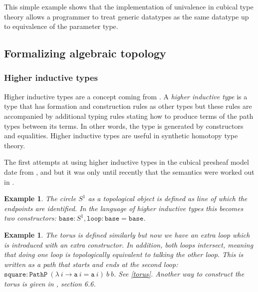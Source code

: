 \documentclass[12pt,a4paper,twoside,xetex,draft]{book}
\newcommand{\keyword}[1]{\emph{#1}\index{#1}}
\newtheorem{example}[theorem]{Example}
\newcommand{\op}[1]{\mathtt{#1}}
\begin{document}
This simple example shows that the implementation of univalence in cubical type theory allows a programmer to treat generic datatypes as the same datatype up to equivalence of the parameter type.

\subsection{Formalizing algebraic topology}

\subsubsection{Higher inductive types}\label{hit}

Higher inductive types are a concept coming from \cite{Voevodsky2013}. A \keyword{higher inductive type} is a type that has formation and construction rules  as other types but these rules are accompanied by additional typing rules stating how to produce terms of the path types between its terms. In other words, the type is generated by constructors and equalities. Higher inductive types are useful in synthetic homotopy type theory.

The first attempts at using higher inductive types in the cubical presheaf model date from \cite{Licata2015}, \cite{Huber2016} and \cite{Cohen2016} but it was only until recently that the semantics were worked out in \cite{Coquand2018}.



\begin{example}
The \keyword{circle} $S^1$ as a topological object is defined as line of which the endpoints are identified. In the language of higher inductive types this becomes two constructors: $\op{base} : S^1,  \op{loop} : \op{base} = \op{base}$.
\end{example}

\begin{example}
The \keyword{torus} is defined similarly but now we have an extra loop which is introduced with an extra constructor. In addition, both loops intersect, meaning that doing one loop is topologically equivalent to talking the other loop. This is written as a path that starts and ends at the second loop: $\op{square} : \op{PathP} \ (\lambda \ i \rightarrow \op{a} \ i = \op{a} \ i) \ b  \ b$. See \cref{torus}. Another way to construct the torus is given in \cite{Voevodsky2013}, section 6.6.
\end{example}
\end{document}
